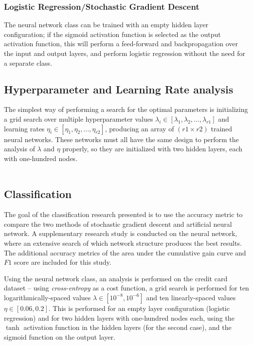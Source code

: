             \subsubsection{Logistic Regression/Stochastic Gradient Descent}
            
            The neural network class can be trained with an empty hidden layer configuration; if the sigmoid activation function is selected as the output activation function, this will perform a feed-forward and backpropagation over the input and output layers, and perform logistic regression without the need for a separate class.
        
        \subsection{Hyperparameter and Learning Rate analysis}
            The simplest way of performing a search for the optimal parameters is initializing a grid search over multiple hyperparameter values $\lambda_i \in [\lambda_1, \lambda_2, \hdots, \lambda_{r1}]$ and learning rates $\eta_i \in [\eta_1, \eta_2, \hdots, \eta_{r2}]$, producing an array of $(r1 \times r2)$ trained neural networks. These networks must all have the same design to perform the analysis of $\lambda$ and $\eta$ properly, so they are initialized with two hidden layers, each with one-hundred nodes.  \\\\
          
    \subsection{Classification}
        The goal of the classification research presented is to use the accuracy metric to compare the two methods of stochastic gradient descent and artificial neural network. A supplementary research study is conducted on the neural network, where an extensive search of which network structure produces the best results. The additional accuracy metrics of the area under the cumulative gain curve and $F1$ score are included for this study.

            Using the neural network class, an analysis is performed on the credit card dataset – using \textit{cross-entropy} as a cost function, a grid search is performed for ten logarithmically-spaced values $\lambda \in [10^{-8}, 10^{-6}]$ and ten linearly-spaced values $\eta \in [0.06, 0.2]$.  This is performed for an empty layer configuration (logistic regression) and for two hidden layers with one-hundred nodes each, using the $\tanh$ activation function in the hidden layers (for the second case), and the sigmoid function on the output layer.
            
